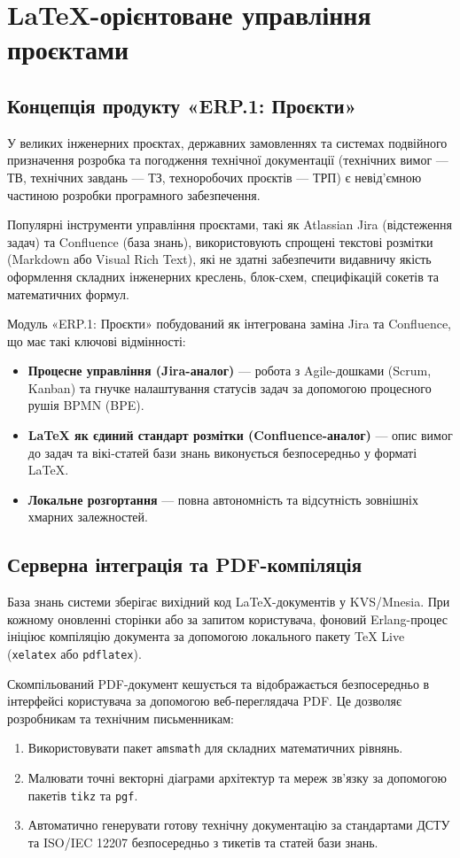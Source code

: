 \chapter{LaTeX-орієнтоване управління проєктами}

\section{Концепція продукту «ERP.1: Проєкти»}
У великих інженерних проєктах, державних замовленнях та системах подвійного призначення розробка та погодження технічної документації (технічних вимог --- ТВ, технічних завдань --- ТЗ, техноробочих проєктів --- ТРП) є невід'ємною частиною розробки програмного забезпечення.

Популярні інструменти управління проєктами, такі як Atlassian Jira (відстеження задач) та Confluence (база знань), використовують спрощені текстові розмітки (Markdown або Visual Rich Text), які не здатні забезпечити видавничу якість оформлення складних інженерних креслень, блок-схем, специфікацій сокетів та математичних формул.

Модуль «ERP.1: Проєкти» побудований як інтегрована заміна Jira та Confluence, що має такі ключові відмінності:
\begin{itemize}
    \item \textbf{Процесне управління (Jira-аналог)} --- робота з Agile-дошками (Scrum, Kanban) та гнучке налаштування статусів задач за допомогою процесного рушія BPMN (BPE).
    \item \textbf{LaTeX як єдиний стандарт розмітки (Confluence-аналог)} --- опис вимог до задач та вікі-статей бази знань виконується безпосередньо у форматі LaTeX.
    \item \textbf{Локальне розгортання} --- повна автономність та відсутність зовнішніх хмарних залежностей.
\end{itemize}

\section{Серверна інтеграція та PDF-компіляція}
База знань системи зберігає вихідний код LaTeX-документів у KVS/Mnesia. При кожному оновленні сторінки або за запитом користувача, фоновий Erlang-процес ініціює компіляцію документа за допомогою локального пакету TeX Live (\texttt{xelatex} або \texttt{pdflatex}).

Скомпільований PDF-документ кешується та відображається безпосередньо в інтерфейсі користувача за допомогою веб-переглядача PDF. Це дозволяє розробникам та технічним письменникам:
\begin{enumerate}
    \item Використовувати пакет \texttt{amsmath} для складних математичних рівнянь.
    \item Малювати точні векторні діаграми архітектур та мереж зв'язку за допомогою пакетів \texttt{tikz} та \texttt{pgf}.
    \item Автоматично генерувати готову технічну документацію за стандартами ДСТУ та ISO/IEC 12207 безпосередньо з тикетів та статей бази знань.
\end{enumerate}

